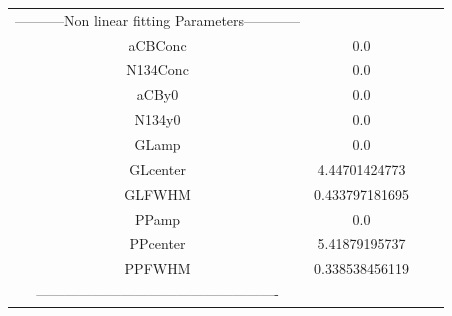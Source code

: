 \documentclass{article}
\begin{document}
\begin{tabular}{c c c c}

-----------Non linear fitting Parameters------------\\
aCBConc    &0.0\\
N134Conc   &0.0\\
aCBy0      &0.0\\
N134y0     &0.0\\
GLamp      &0.0\\
GLcenter   &4.44701424773\\
GLFWHM     &0.433797181695\\
PPamp      &0.0\\
PPcenter   &5.41879195737\\
PPFWHM     &0.338538456119\\
----------------------------------------------------\\


\end{tabular}
\end{document}
